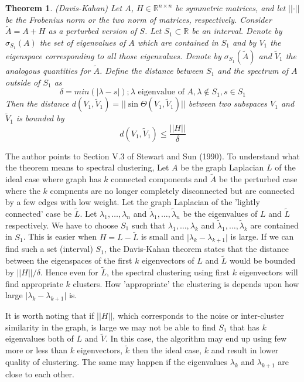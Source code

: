 \documentclass[10pt,a4paper, nocenter]{report}
\newtheorem{theorem}{Theorem}
\newcommand{\abs}[1]{\lvert {#1} \rvert}
\newcommand{\norm}[1]{\lvert\lvert {#1} \rvert\rvert}
\begin{document}
	\begin{theorem} (Davis-Kahan) Let $A$, $H\in\mathbb{R}^{n\times n}$ be symmetric matrices, and let $\norm{\cdot}$ be the Frobenius norm or the two norm of matrices, respectively. Consider $\tilde{A} = A+H$ as a perturbed version of $S$. Let $S_{1} \subset \mathbb{R}$ be an interval. Denote by $\sigma_{S_{1}}(A)$ the set of eigenvalues of $A$ which are contained in $S_{1}$ and by $V_{1}$ the eigenspace corresponding to all those eigenvalues. Denote by $\sigma_{S_{1}}(\tilde{A})$ and $\tilde{V}_{1}$ the analogous quantities for $\tilde{A}$. Define the distance between $S_{1}$ and the spectrum of $A$ outside of $S_{1}$ as $$\delta = min(\abs{\lambda - s}); \lambda\text{ eigenvalue of }A, \lambda\notin S_{1}, s\in S_{1}$$ Then the distance $d(V_{1},\tilde{V}_{1}) =\norm{\sin \Theta(V_{1},\tilde{V}_{1})} $ between two subspaces $V_{1}$ and $\tilde{V}_{1}$ is bounded by $$ d(V_{1},\tilde{V}_{1}) \le \frac{\norm{H}}{\delta} $$
	\end{theorem}

	The author points to Section V.3 of Stewart and Sun (1990)\cite{stsu:90}. To understand what the theorem means to spectral clustering, Let $A$ be the graph Laplacian $L$ of the ideal case where graph has $k$ connected components and $\tilde{A}$ be the perturbed case where the $k$ compnents are no longer completely disconnected but are connected by a few edges with low weight. Let the graph Laplacian of the 'lightly connected' case be $\tilde{L}$. Let $\lambda_{1},\dots,\lambda_{n}$ and $\tilde{\lambda}_{1},\dots,\tilde{\lambda}_{n}$ be the eigenvalues of $L$ and $\tilde{L}$ respectively. We have to choose $S_{1}$ such that $\lambda_{1},\dots,\lambda_{k}$ and $\tilde{\lambda}_{1},\dots,\tilde{\lambda}_{k}$ are contained in $S_{1}$. This is easier when $H=L-\tilde{L}$ is small and $\abs{\lambda_{k} - \lambda_{k+1}}$ is large. If we can find such a set (interval) $S_{1}$, the Davis-Kahan theorem states that the distance between the eigenspaces of the first $k$ eigenvectors of $L$ and $\tilde{L}$ would be bounded by $\norm{H}/\delta$. Hence even for $\tilde{L}$, the spectral clustering using first $k$ eigenvectors will find appropriate $k$ clusters. How 'appropriate' the clustering is depends upon how large $\abs{\lambda_{k}-\lambda_{k+1}}$ is. 
	
	It is worth noting that if $\norm{H}$, which corresponds to the noise or inter-cluster similarity in the graph, is large we may not be able to find $S_{1}$ that has $k$ eigenvalues both of $L$ and $\tilde{V}$. In this case, the algorithm may end up using few more or less than $k$ eigenvectors, $\tilde{k}$ then the ideal case, $k$ and result in lower quality of clustering. The same may happen if the eigenvalues $\lambda_{k}$ and $\lambda_{k+1}$ are close to each other.
	
\end{document}
